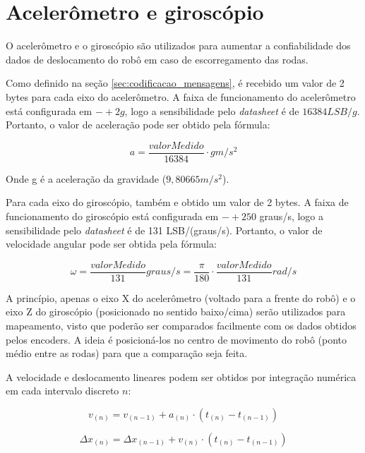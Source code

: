 \section{Acelerômetro e giroscópio}
\label{sec:teoria_acel_giro}

O acelerômetro e o giroscópio são utilizados para aumentar a confiabilidade dos dados de deslocamento do robô em caso de escorregamento das rodas.



Como definido na seção \ref{sec:codificacao_mensagens}, é recebido um valor de 2 bytes para cada eixo do acelerômetro. A faixa de funcionamento do acelerômetro está configurada em $-+2g$, logo a sensibilidade pelo \textit{datasheet} é de $16384 LSB/g$. Portanto, o valor de aceleração pode ser obtido pela fórmula:

\begin{equation}
  a = \frac{valorMedido}{16384} \cdot g \unit{m/s^2}
  \label{eq:acel}
\end{equation}

Onde g é a aceleração da gravidade ($9,80665 \unit{m/s^2}$). 

Para cada eixo do giroscópio, também e obtido um valor de 2 bytes. A faixa de funcionamento do giroscópio está configurada em $-+250$ graus/s, logo a sensibilidade pelo \textit{datasheet} é de 131 LSB/(graus/s). Portanto, o valor de velocidade angular pode ser obtida pela fórmula:

\begin{equation}
  \omega = \frac{valorMedido}{131} \unit{graus/s} = \frac{\pi}{180} \cdot \frac{valorMedido}{131} \unit{rad/s}
  \label{eq:giro}
\end{equation}


A princípio, apenas o eixo X do acelerômetro (voltado para a frente do robô) e o eixo Z do giroscópio (posicionado no sentido baixo/cima) serão utilizados para mapeamento, visto que poderão ser comparados facilmente com os dados obtidos pelos encoders. A ideia é posicioná-los no centro de movimento do robô (ponto médio entre as rodas) para que a comparação seja feita.

A velocidade e deslocamento lineares podem ser obtidos por integração numérica em cada intervalo discreto $n$:

\begin{equation}
  v_{(n)} = v_{(n - 1)} + a_{(n)} \cdot (t_{(n)} - t_{(n-1)})
  \label{eq:v_acel}
\end{equation}

\begin{equation}
  \Delta x_{(n)} = \Delta x_{(n - 1)} + v_{(n)} \cdot (t_{(n)} - t_{(n-1)})
  \label{eq:v_acel}
\end{equation}

